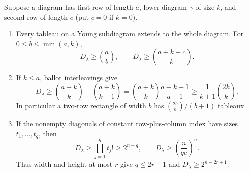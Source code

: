 \begin{lemma}\label{l:tableau-constructions}
Suppose a diagram has first row of length $a$, lower diagram $\gamma$
of size $k$, and second row of length $c$ (put $c=0$ if $k=0$).
\begin{enumerate}
\item Every tableau on a Young subdiagram extends to the whole diagram.
For $0\le b\le\min(a,k)$,
\begin{equation}\label{l:tableau-interleave}
 D_\lambda\ge\binom ab,
 \qquad D_\lambda\ge\binom{a+k-c}{k}.
\end{equation}
\item If $k\le a$, ballot interleavings give
\begin{equation}\label{l:tableau-ballot}
 D_\lambda\ge\binom{a+k}{k}-\binom{a+k}{k-1}
 =\binom{a+k}{k}\frac{a-k+1}{a+1}
 \ge\frac1{k+1}\binom{2k}{k}.
\end{equation}
In particular a two-row rectangle of width $b$ has
$\binom{2b}{b}/(b+1)$ tableaux.
\item If the nonempty diagonals of constant row-plus-column index
have sizes $t_1,\ldots,t_q$, then
\begin{equation}\label{l:tableau-diagonal}
 D_\lambda\ge\prod_{j=1}^q t_j!
 \ge2^{n-q},\qquad
 D_\lambda\ge\left(\frac n{qe}\right)^n.
\end{equation}
Thus width and height at most $r$ give $q\le2r-1$ and
$D_\lambda\ge2^{n-2r+1}$.
\end{enumerate}
\end{lemma}
